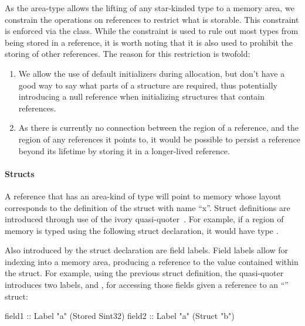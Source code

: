 As the  area-type allows the lifting of any star-kinded type to a
memory area, we constrain the operations on references to restrict what is
storable.  This constraint is enforced via the  class.  While the
 constraint is used to rule out most types from being stored in a
reference, it is worth noting that it is also used to prohibit the storing of other
references.  The reason for this restriction is twofold:

\begin{enumerate}
\item We allow the use of default initializers during allocation, but don't have
  a good way to say what parts of a structure are required, thus potentially
  introducing a null reference when initializing structures that contain
  references.
\item As there is currently no connection between the region of a reference, and
  the region of any references it points to, it would be possible to persist a
  reference beyond its lifetime by storing it in a longer-lived reference.
\end{enumerate}

\paragraph{Structs} A reference that has an area-kind of type 
will point to memory whose layout corresponds to the definition of the struct
with name ``x''.  Struct definitions are introduced through use of the ivory
quasi-quoter~\cite{quoted}.  For example, if a region of memory is typed using
the following struct declaration, it would have type .

\begin{code}
\end{code}

Also introduced by the struct declaration are field labels.  Field labels allow
for indexing into a memory area, producing a reference to the value contained
within the struct.  For example, using the previous struct definition, the
quasi-quoter introduces two labels,  and , for accessing
those fields given a reference to an ``'' struct:

\begin{code}
field1 :: Label "a" (Stored Sint32)
field2 :: Label "a" (Struct "b")
\end{code}

